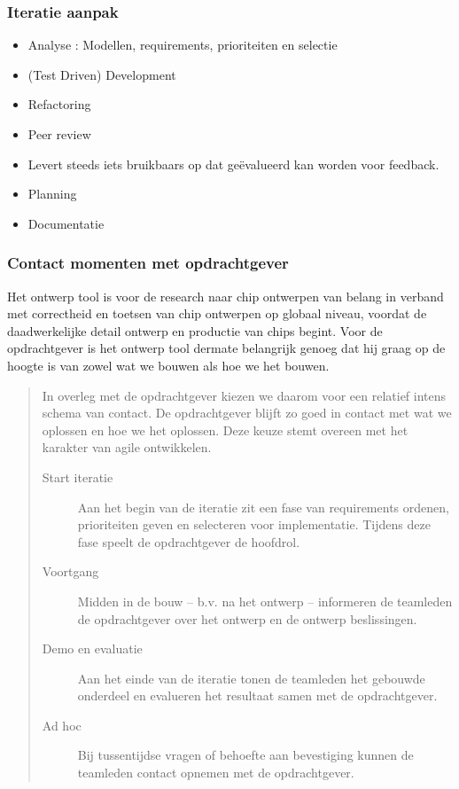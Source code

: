 \subsubsection{Iteratie aanpak}
\begin{itemize}
 \item Analyse : Modellen, requirements,  prioriteiten en selectie
 \item (Test Driven) Development
 \item Refactoring
 \item Peer review
 \item Levert steeds iets bruikbaars op dat ge\"evalueerd kan worden voor feedback.
 \item Planning
 \item Documentatie
\end{itemize}

\subsubsection{Contact momenten met opdrachtgever}
Het ontwerp tool is voor de research naar chip ontwerpen van belang in verband 
met correctheid en toetsen van chip ontwerpen op globaal niveau, voordat de 
daadwerkelijke detail ontwerp en productie van chips begint. Voor de 
opdrachtgever is het ontwerp tool {\gray dermate} belangrijk genoeg dat hij graag op de 
hoogte is van {\gray zowel} wat we bouwen {\gray als hoe we het bouwen}.

\begin{quote}
{\gray\tiny In overleg met de opdrachtgever kiezen we daarom voor een relatief intens schema van 
contact. De opdrachtgever blijft zo goed in contact met wat we oplossen en
hoe we het oplossen. Deze keuze stemt overeen met het karakter van agile ontwikkelen.
\begin{description}
    \item[Start iteratie] Aan het begin van de iteratie zit een fase van requirements ordenen, prioriteiten geven en selecteren voor implementatie.
    Tijdens deze fase speelt de opdrachtgever de hoofdrol.
    \item[Voortgang] Midden in de bouw -- b.v. na het ontwerp -- informeren de teamleden de opdrachtgever over het ontwerp en de ontwerp beslissingen.
    \item[Demo en evaluatie] Aan het einde van de iteratie tonen de teamleden het gebouwde onderdeel en evalueren het resultaat samen met de opdrachtgever.
    \item[Ad hoc] Bij tussentijdse vragen of behoefte aan bevestiging kunnen de teamleden contact opnemen met de opdrachtgever.
\end{description}
}
\end{quote}

